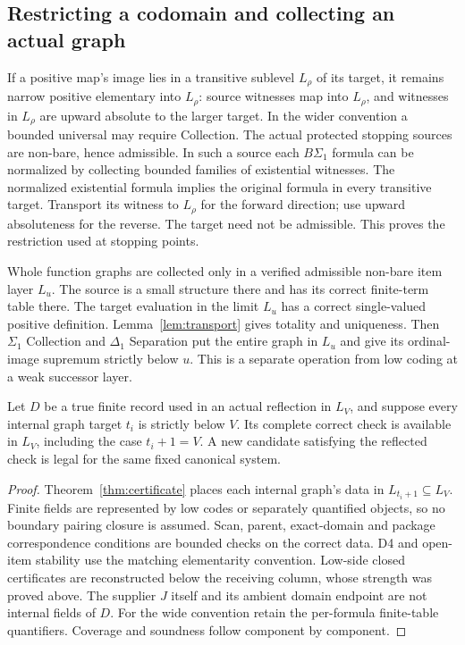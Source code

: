 \subsection{Restricting a codomain and collecting an actual graph}
If a positive map's image lies in a transitive sublevel $L_\rho$ of
its target, it remains narrow positive elementary into $L_\rho$:
source witnesses map into $L_\rho$, and witnesses in $L_\rho$ are
upward absolute to the larger target. In the wider convention a
bounded universal may require Collection. The actual protected
stopping sources are non-bare, hence admissible. In such a source
each $B\Sigma_1$ formula can be normalized by collecting bounded
families of existential witnesses. The normalized existential
formula implies the original formula in every transitive target.
Transport its witness to $L_\rho$ for the forward direction; use
upward absoluteness for the reverse. The target need not be
admissible. This proves the restriction used at stopping points.

Whole function graphs are collected only in a verified admissible
non-bare item layer $L_u$. The source is a small structure there and
has its correct finite-term table there. The target evaluation in
the limit $L_u$ has a correct single-valued positive definition.
Lemma~\ref{lem:transport} gives totality and uniqueness. Then
$\Sigma_1$ Collection and $\Delta_1$ Separation put the entire graph
in $L_u$ and give its ordinal-image supremum strictly below $u$.
This is a separate operation from low coding at a weak successor
layer. 

\begin{corollary}
Let $D$ be a true finite record used in an actual reflection in $L_V$,
and suppose every internal graph target $t_i$ is strictly below $V$.
Its complete correct check is available in $L_V$, including the case
$t_i+1=V$. A new candidate satisfying the reflected check is legal
for the same fixed canonical system.
\end{corollary}
\begin{proof}
Theorem~\ref{thm:certificate} places each internal graph's data in
$L_{t_i+1}\subseteq L_V$. Finite fields are represented by low codes
or separately quantified objects, so no boundary pairing closure
is assumed. Scan, parent, exact-domain and package correspondence
conditions are bounded checks on the correct data. D4 and open-item
stability use the matching elementarity convention. Low-side closed
certificates are reconstructed below the receiving column, whose
strength was proved above. The supplier $J$ itself and its ambient
domain endpoint are not internal fields of $D$. For the wide
convention retain the per-formula finite-table quantifiers.
Coverage and soundness follow component by component. 
\end{proof}


